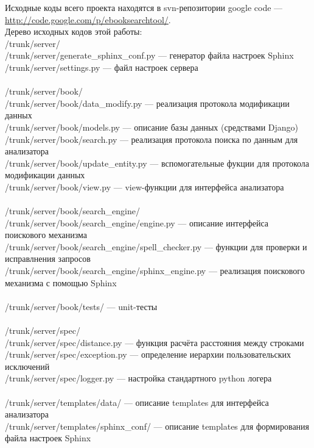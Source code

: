 \documentclass[a4paper,12pt]{article}
\begin{document}
{\small

Исходные коды всего проекта находятся в svn-репозитории google code ---\\ 
\url{http://code.google.com/p/ebooksearchtool/}.
\\

Дерево исходных кодов этой работы:
\\
/trunk/server/ \\
/trunk/server/generate\_sphinx\_conf.py --- генератор файла настроек Sphinx \\
/trunk/server/settings.py --- файл настроек сервера \\
\\
/trunk/server/book/ \\
/trunk/server/book/data\_modify.py --- реализация протокола модификации данных \\
/trunk/server/book/models.py --- описание базы данных (средствами Django) \\
/trunk/server/book/search.py --- реализация протокола поиска по данным для анализатора \\
/trunk/server/book/update\_entity.py --- вспомогательные фукции для протокола модификации данных \\
/trunk/server/book/view.py --- view-функции для интерфейса анализатора \\
\\
/trunk/server/book/search\_engine/ \\
/trunk/server/book/search\_engine/engine.py --- описание интерфейса поискового механизма \\
/trunk/server/book/search\_engine/spell\_checker.py --- функции для проверки и исправлнения запросов \\
/trunk/server/book/search\_engine/sphinx\_engine.py --- реализация поискового механизма с помощью Sphinx \\
\\
/trunk/server/book/tests/ --- unit-тесты \\
\\
/trunk/server/spec/ \\
/trunk/server/spec/distance.py --- функция расчёта расстояния между строками \\
/trunk/server/spec/exception.py --- определение иерархии пользовательских исключений \\
/trunk/server/spec/logger.py --- настройка стандартного python логера \\
\\
/trunk/server/templates/data/ --- описание templates для интерфейса анализатора \\
/trunk/server/templates/sphinx\_conf/ --- описание templates для формирования файла настроек Sphinx \\
}
\end{document}
